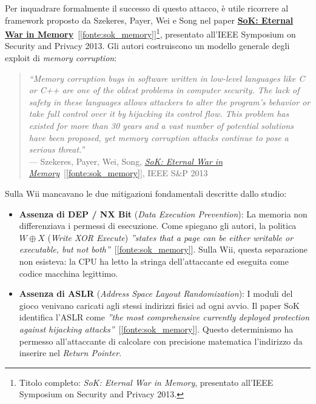 Per inquadrare formalmente il successo di questo attacco, è utile ricorrere al framework proposto da Szekeres, Payer, Wei e Song nel paper \hyperref[fonte:sok_memory]{\textbf{SoK: Eternal War in Memory}}~[\ref{fonte:sok_memory}]\footnote{Titolo completo: \textit{SoK: Eternal War in Memory}, presentato all'IEEE Symposium on Security and Privacy 2013.}, presentato all'IEEE Symposium on Security and Privacy 2013. Gli autori costruiscono un modello generale degli exploit di \textit{memory corruption}:

\begin{quote}
    \textit{``Memory corruption bugs in software written in low-level languages like C or C++ are one of the oldest problems in computer security. The lack of safety in these languages allows attackers to alter the program's behavior or take full control over it by hijacking its control flow. This problem has existed for more than 30 years and a vast number of potential solutions have been proposed, yet memory corruption attacks continue to pose a serious threat.''}\\
    --- Szekeres, Payer, Wei, Song, \hyperref[fonte:sok_memory]{\textit{SoK: Eternal War in Memory}}~[\ref{fonte:sok_memory}], IEEE S\&P 2013
\end{quote}

Sulla Wii mancavano le due mitigazioni fondamentali descritte dallo studio:

\begin{itemize}
    \item \textbf{Assenza di DEP / NX Bit} (\textit{Data Execution Prevention}): La memoria non differenziava i permessi di esecuzione. Come spiegano gli autori, la politica $W \oplus X$ (\textit{Write XOR Execute}) \textit{''states that a page can be either writable or executable, but not both''}~[\ref{fonte:sok_memory}]. Sulla Wii, questa separazione non esisteva: la CPU ha letto la stringa dell'attaccante ed eseguita come codice macchina legittimo.
    \item \textbf{Assenza di ASLR} (\textit{Address Space Layout Randomization}): I moduli del gioco venivano caricati agli stessi indirizzi fisici ad ogni avvio. Il paper SoK identifica l'ASLR come \textit{''the most comprehensive currently deployed protection against hijacking attacks''}~[\ref{fonte:sok_memory}]. Questo determinismo ha permesso all'attaccante di calcolare con precisione matematica l'indirizzo da inserire nel \textit{Return Pointer}.
\end{itemize}


